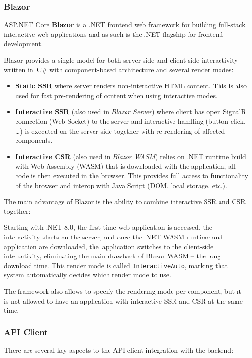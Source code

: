 \newpage
\subsubsection{Blazor}
ASP.NET Core \textbf{Blazor} is a .NET frontend web framework for building full-stack interactive web applications and as such is the .NET flagship for frontend development.

Blazor provides a single model for both server side and client side interactivity written in~C\# with component-based architecture and several render modes:
\begin{itemize}
    \item \textbf{Static SSR} where server renders non-interactive HTML content. This is also used for fast pre-rendering of content when using interactive modes.

    \item \textbf{Interactive SSR} (also used in \textit{Blazor Server}) where client has open SignalR connection (Web Socket) to the server and interactive handling (button click, \dots) is executed on the server side together with re-rendering of affected components.

    \item \textbf{Interactive CSR} (also used in \textit{Blazor WASM}) relies on .NET runtime build with Web Assembly (WASM) that is downloaded with the application, all code is then executed in the browser. This provides full access to functionality of the browser and interop with Java Script (DOM, local storage, etc.).
\end{itemize}

The main advantage of Blazor is the ability to combine interactive SSR and CSR together:

Starting with .NET 8.0, the first time web application is accessed, the interactivity starts on the server, and once the .NET WASM runtime and application are downloaded, the~application switches to the client-side interactivity, eliminating the main drawback of Blazor WASM -- the long download time. This render mode is called \texttt{InteractiveAuto}, marking that system automatically decides which render mode to use.

The framework also allows to specify the rendering mode per component, but it is not allowed to have an application with interactive SSR and CSR at the same time.

\subsubsection{API Client}
There are several key aspects to the API client integration with the backend:

